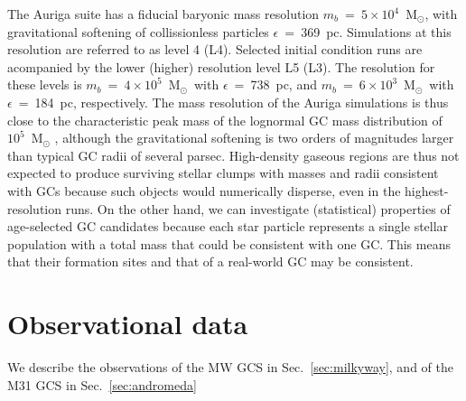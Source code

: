 \documentclass[a4paper,fleqn,usenatbib]{mnras}
\newcommand{\Sun}[0]{\ensuremath{_{\odot}}}
\begin{document}
The Auriga suite has a fiducial baryonic mass resolution $m_b$~=~$5 \times 10^4$~M\Sun,
with gravitational softening of collissionless particles $\epsilon$~=~369~pc.
Simulations at this resolution are referred to as level 4 (L4). Selected
initial condition runs are acompanied by the lower (higher) resolution level L5 (L3).
The resolution for these levels is $m_b$~=~$4 \times 10^5$~M\Sun \, with 
$\epsilon$~=~738~pc, and $m_b$~=~$6 \times 10^3$~M\Sun \, with $\epsilon$~=~184~pc,
respectively. The mass resolution of the Auriga simulations is thus close to the 
characteristic peak mass of the lognormal GC mass distribution of $10^{5}$~M\Sun 
\citep{1991ARA&A..29..543H}, although the gravitational softening is two orders 
of magnitudes larger than typical GC radii of several parsec. High-density gaseous 
regions are thus not expected to produce surviving stellar clumps with masses and 
radii consistent with GCs because such objects would numerically disperse, even 
in the highest-resolution runs. On the other hand, we can investigate (statistical) 
properties of age-selected GC candidates because each star particle represents a
single stellar population with a total mass that could be consistent with one GC. 
This means that their formation sites and that of a real-world GC may be consistent.

\section{Observational data}
\label{sec:observations}
We describe the observations of the MW GCS in Sec.~\ref{sec:milkyway},
and of the M31 GCS in Sec.~\ref{sec:andromeda}
\end{document}
